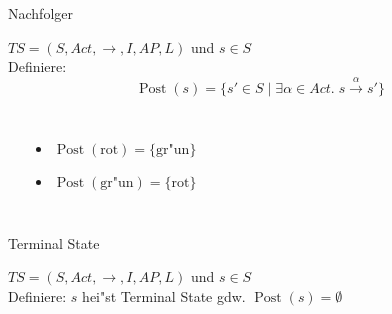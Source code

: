 \documentclass{beamer}
\DeclareMathOperator{\Post}{Post}
\begin{document}
\begin{frame}{Nachfolger}
    \begin{Definition}[Nachfolger]
        $TS = (S, Act, \rightarrow, I, AP, L)$ und $s \in S$ \\
        Definiere:
        $$\Post(s) = \Big\{s' \in S \; | \; \exists \alpha \in Act.\; s \overset{\alpha}{\rightarrow} s' \Big\}$$
    \end{Definition}

    \pause

    \begin{Beispiel}
        \begin{columns}
                \begin{center}
                    \ampel
                \end{center}

                \begin{itemize}
                    \setlength{\itemsep}{1em}
                    \item $\Post(\text{rot}) = \{\text{gr"un}\}$
                    \item $\Post(\text{gr"un}) = \{\text{rot}\}$
                \end{itemize}
        \end{columns}
    \end{Beispiel}
\end{frame}

\begin{frame}{Terminal State}
    \begin{Definition} %
        $TS = (S, Act, \rightarrow, I, AP, L)$ und $s \in S$ \\[\baselineskip]
        Definiere:
        $s$ hei"st \alert{Terminal State}
        gdw. $\displaystyle\Post(s) = \emptyset$
    \end{Definition}
\end{frame}
\end{document}
